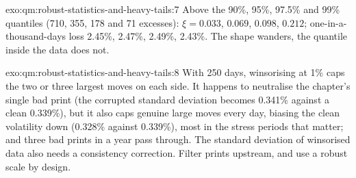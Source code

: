 \begin{solution}{exo:qm:robust-statistics-and-heavy-tails:7}
Above the 90\%, 95\%, 97.5\% and 99\% quantiles (710, 355, 178 and 71 excesses): $\xi = 0.033$, $0.069$, $0.098$, $0.212$; one-in-a-thousand-days
loss 2.45\%, 2.47\%, 2.49\%, 2.43\%. The shape wanders, the quantile inside the data does not.
\end{solution}

\begin{solution}{exo:qm:robust-statistics-and-heavy-tails:8}
With 250 days, winsorising at 1\% caps the two or three largest moves on each side. It happens to neutralise the chapter's single bad print
(the corrupted standard deviation becomes 0.341\% against a clean 0.339\%), but it also caps genuine large moves every day, biasing the
clean volatility down (0.328\% against 0.339\%), most in the stress periods that matter; and three bad prints in a year pass through. The
standard deviation of winsorised data also needs a consistency correction. Filter prints upstream, and use a robust scale by design.
\end{solution}

